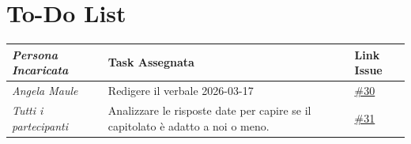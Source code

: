 \documentclass[a4paper,12pt]{article}
\begin{document}
\section{To-Do List}
\begin{table}[h]
    \centering
    \begin{tabular}{|l|p{5cm}|l|}
    \hline
        \rowcolor{lightgray}\textit{\textbf{Persona Incaricata}}  & \textbf{Task Assegnata} &\textbf{Link Issue} \\
    \hline
        \textit{Angela Maule} &  Redigere il verbale 2026-03-17 & \href{https://github.com/aLittleByte-19/Documentazione/issues/30}{\#30}\\
    \hline
        \textit{Tutti i partecipanti} & Analizzare le risposte date per capire se il capitolato è adatto a noi o meno. &\href{https://github.com/aLittleByte-19/Documentazione/issues/31}{\#31}\\
    \hline
    \end{tabular}
    \label{tab:todo}
\end{table}
\end{document}
